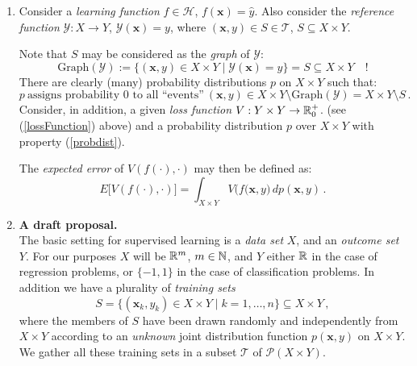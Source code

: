 \begin{description}[style=unboxed,leftmargin=0cm,itemsep=3ex]
\begin{enumerate}
\item\label{expectedError}
Consider a {\em learning function\/} $f\in\mathscr{H}$,
$f(\mathbf{x})=\widehat{y}$.
Also consider the {\em reference function\/} $\mathscr{Y}:X\to Y$, 
$\mathscr{Y}(\mathbf{x})=y$, where $(\mathbf{x},y)\in S\in\mathscr{T}$,
$S\subseteq X\times Y$.

Note that $S$ may be considered as the {\em graph\/} of $\mathscr{Y}$:
$$
\text{Graph}(\mathscr{Y})
:= \big\{ (\mathbf{x}, y)\in X\times Y \mid \mathscr{Y}(\mathbf{x})=y\big\}
= S\subseteq X\times Y\quad !
$$
There are clearly (many) probability distributions $p$ on $X\times Y$
such that:
\begin{equation}\label{probdist}
p\ \text{assigns probability 0 to all ``events''}\  
(\mathbf{x},y)\in X\times Y\setminus\text{Graph}(\mathscr{Y})
= X\times Y\setminus S\,.
\end{equation}
Consider, in addition, a given {\em loss function\/} $V:Y\times Y\to{\mathbb R }_0^+$.
(see (\ref{lossFunction}) above) and a probability distribution $p$ over
$X\times Y$ with property (\ref{probdist}).

The {\em expected error\/} of $V(f(\cdot),\cdot)$ may then be defined as:
$$
E\big[ V( f(\cdot),\cdot) \big]
= \int_{X\times Y} V\big( f(\mathbf{x},y \big)\,dp(\mathbf{x},y)\,.
$$


\vspace{4ex}
\item
{\color{blue}
{\Large\bf A draft proposal.} \\[1ex]
The basic setting for supervised learning is a {\em data set\/} $X$, 
and an  {\em outcome set\/} $Y$.
For our purposes $X$ will be ${\mathbb R }^m$, $m\in{\mathbb N }$, and $Y$ either ${\mathbb R }$
in the case of regression problems, or $\{-1,1\}$ in the case of
classification problems.
In addition we have a plurality of {\em training sets\/}
$$
S=\bigg\{ (\mathbf{x}_k,y_k)\in X\times Y \mid k=1,\dots,n \bigg\}
\subseteq X\times Y\,,
$$
where the members of $S$ have been drawn randomly and independently
from $X\times Y$ according to an {\em unknown\/} joint distribution
function $p(\mathbf{x},y)$ on $X\times Y$.
We gather all these training sets in a subset $\mathscr{T}$ of
$\mathscr{P}(X\times Y)$.

}
\end{enumerate}
\end{description}
